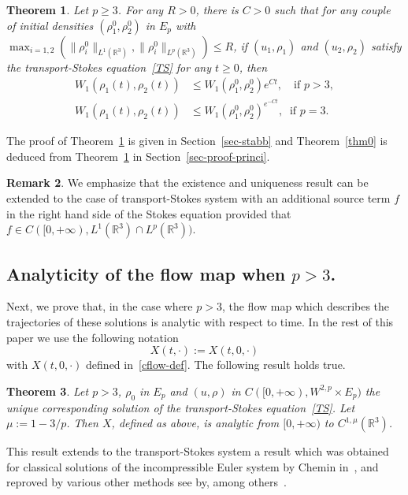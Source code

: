 \documentclass[10pt]{amsart}
\newtheorem{theo}{Theorem}[section]
\theoremstyle{definition}\newtheorem{defi}[theo]{Definition}\newtheorem{rema}[theo]{Remark}\newtheorem{exam}[theo]{Example}\newtheorem{exem}[theo]{Example}\newtheorem{nota}[theo]{Notation}
\newcommand{\R}{\mathbb{R}}
\renewcommand{\leq}{\leqslant}
\renewcommand{\geq}{\geqslant}
\begin{document}
\begin{theo} \label{thm}
Let $p\geq 3$. For any $R>0$, there is $C>0$ such that for any couple of initial densities $ (\rho_1^0, \rho_2^0)$ in $E_p $ with $ \max_{i=1,2} (\|\rho_i^0\|_{ L^1 (\R^3) },\|\rho_i^0\|_{ L^p (\R^3) }) \leq R$, if $ (u_1,\rho_1) $ and $ (u_2,\rho_2)$ satisfy the transport-Stokes equation~\eqref{TS} for any $t\geq 0$, then
\begin{align}
W_1(\rho_1(t),\rho_2(t)) &\leq W_1(\rho_1^0,\rho_2^0)e^{C t}, \quad \text{if } p > 3,\label{sta-geq-3}
\\ 
W_1 (\rho_1(t),\rho_2(t)) &\leq W_1(\rho_1^0,\rho_2^0)^{e^{-C t}}, \;\; \text{if } p = 3.\label{sta-geq-critik}
\end{align}
\end{theo}


The proof of Theorem~\ref{thm} is given in Section~\ref{sec-stabb} and Theorem~\ref{thm0} is deduced from Theorem~\ref{thm} in Section~\ref{sec-proof-princi}.

\begin{rema}\label{rem:TS_avec_terme_source}
We emphasize that the existence and uniqueness result can be extended to the case of transport-Stokes system with an additional source term $f$ in the right hand side of the Stokes equation provided that $f \in C([0,+\infty), L^1(\R^3) \cap L^p(\R^3))$.
\end{rema}


\subsection{Analyticity of the flow map when \texorpdfstring{$p > 3$}{p>3}.}

Next, we prove that, in the case where $p>3$, the flow map which describes the trajectories of these solutions is analytic with respect to time. In the rest of this paper we use the following notation
\[
X(t,\cdot):=X(t,0,\cdot)
\]
with $X(t,0,\cdot)$ defined in~\eqref{cflow-def}. The following result holds true.
\begin{theo}\label{analytic}
Let $p>3$, $\rho_0$ in $E_p$ and $ (u,\rho)$ in $C([0,+\infty),W^{2,p} \times E_p)$ the unique corresponding solution of the transport-Stokes equation~\eqref{TS}. Let $\mu:=1-3/p$. Then $ X$, defined as above, is analytic from $[0,+\infty)$ to $ C^{1,\mu}(\R^3)$.
\end{theo} This result extends to the transport-Stokes system a result which was obtained for classical solutions of the incompressible Euler system by Chemin in~\cite{Chemin}, and reproved by various other methods see by, among others~\cite{CVW,FZ,Gamblin,ogfstt,Inci,Kato,
Serfati,Shnirelman}.
\end{document}
